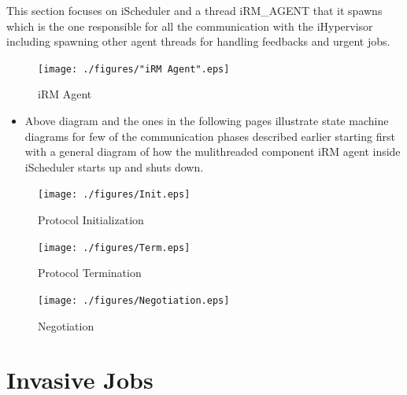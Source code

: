 This section focuses on iScheduler and a thread iRM\_AGENT that it spawns which is the one responsible for all the communication with the iHypervisor including spawning other agent threads for handling feedbacks and urgent jobs.
\vspace{10mm}
\begin{figure}[h]
\centering
\texttt{[image: ./figures/"iRM Agent".eps]}
\caption{iRM Agent}
\label{fig:Init}
\end{figure}
\begin{itemize}
\item Above diagram and the ones in the following pages illustrate state machine diagrams for few of the communication phases described earlier starting first with a general diagram of how the mulithreaded component iRM agent inside iScheduler starts up and shuts down.
\end{itemize}
\vspace{-20mm}
\begin{figure}[h]
\centering
\texttt{[image: ./figures/Init.eps]}
\caption{Protocol Initialization}
\label{fig:Init}
\end{figure}
\vspace{5mm}
\begin{figure}[h]
\centering
\texttt{[image: ./figures/Term.eps]}
\caption{Protocol Termination}
\label{fig:Term}
\end{figure}
\clearpage
\begin{figure}[h]
\centering
\texttt{[image: ./figures/Negotiation.eps]}
\caption{Negotiation}
\label{fig:Neg}
\end{figure}
\clearpage

\section{Invasive Jobs}
